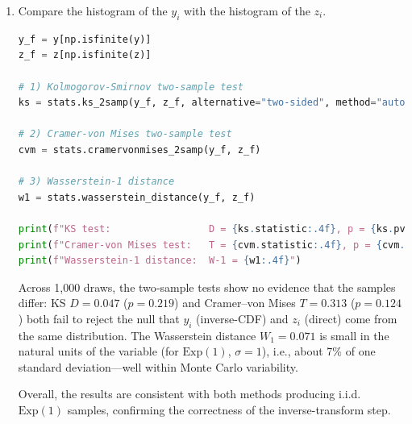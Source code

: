 \documentclass[dvipsnames,11pt]{article}
\begin{document}
\begin{enumerate}[label=\alph*.]
\begin{solution}
            \end{solution}
            
        \item Compare the histogram of the $y_i$ with the histogram of the $z_i$.

            \begin{solution}
    
\begin{lstlisting}[language=python]
y_f = y[np.isfinite(y)]
z_f = z[np.isfinite(z)]

# 1) Kolmogorov-Smirnov two-sample test
ks = stats.ks_2samp(y_f, z_f, alternative="two-sided", method="auto")

# 2) Cramer-von Mises two-sample test
cvm = stats.cramervonmises_2samp(y_f, z_f)

# 3) Wasserstein-1 distance
w1 = stats.wasserstein_distance(y_f, z_f)

print(f"KS test:                 D = {ks.statistic:.4f}, p = {ks.pvalue:.4g}")
print(f"Cramer-von Mises test:   T = {cvm.statistic:.4f}, p = {cvm.pvalue:.4g}")
print(f"Wasserstein-1 distance:  W-1 = {w1:.4f}")
\end{lstlisting}

                Across 1,000 draws, the two‐sample tests show no evidence that the samples differ: KS $D=0.047$ ($p=0.219$) and Cramer–von Mises $T=0.313$ ($p=0.124$) both fail to reject the null that $y_i$ (inverse-CDF) and $z_i$ (direct) come from the same distribution. The Wasserstein distance $W_1=0.071$ is small in the natural units of the variable (for $\mathrm{Exp}(1)$, $\sigma=1$), i.e., about 7\% of one standard deviation—well within Monte Carlo variability. 

                Overall, the results are consistent with both methods producing i.i.d. $\mathrm{Exp}(1)$ samples, confirming the correctness of the inverse-transform step.
            \end{solution}
            
    \end{enumerate}
\end{document}
